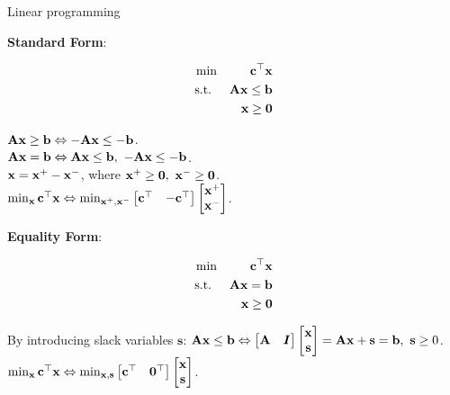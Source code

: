\documentclass[11pt,compress,t,notes=noshow, xcolor=table]{beamer}
\begin{document}
\begin{vbframe}{Linear programming}
\framebreak

\textbf{Standard Form}:
\vspace{-\baselineskip}

\begin{eqnarray*}
\min && \mathbf{c}^\top\mathbf{x} \\
\text{s.t. } && \mathbf{A}\mathbf{x} \le \mathbf{b}\\
&& \mathbf{x} \ge \mathbf{0} \\
\end{eqnarray*}

$\mathbf{A}\mathbf{x} \ge \mathbf{b} \Leftrightarrow -\mathbf{A}\mathbf{x} \le -\mathbf{b}$.\\
$\mathbf{A}\mathbf{x} = \mathbf{b} \Leftrightarrow \mathbf{A}\mathbf{x} \le \mathbf{b},\ -\mathbf{A}\mathbf{x} \le -\mathbf{b}$.\\
$\mathbf{x} = \mathbf{x}^+ - \mathbf{x}^-$, where $\mathbf{x}^+ \ge \mathbf{0},\ \mathbf{x}^- \ge \mathbf{0}$.\\
$\min_{\mathbf{x}} \mathbf{c}^\top\mathbf{x} \Leftrightarrow \min_{\mathbf{x}^+, \mathbf{x}^-} \begin{bmatrix} \mathbf{c}^\top & -\mathbf{c}^\top \end{bmatrix} \begin{bmatrix} \mathbf{x}^+ \\ \mathbf{x}^- \end{bmatrix}$.

\framebreak
\textbf{Equality Form}:
\vspace{-\baselineskip}

\begin{eqnarray*}
\min && \mathbf{c}^\top\mathbf{x} \\
\text{s.t. } && \mathbf{A}\mathbf{x} = \mathbf{b}\\
&& \mathbf{x} \ge \mathbf{0} \\
\end{eqnarray*}

By introducing slack variables $\mathbf{s}$:
$\Amat\xv \le \mathbf{b} \Leftrightarrow \begin{bmatrix} \Amat & \id \end{bmatrix} \begin{bmatrix} \xv \\ \mathbf{s} \end{bmatrix} = \Amat\xv + \mathbf{s} = \mathbf{b},\ \mathbf{s} \ge 0$.\\
$\min_{\mathbf{x}} \mathbf{c}^\top\mathbf{x} \Leftrightarrow \min_{\mathbf{x},\mathbf{s}} \begin{bmatrix} \mathbf{c}^\top & \mathbf{0}^\top \end{bmatrix} \begin{bmatrix} \mathbf{x} \\ \mathbf{s} \end{bmatrix}$.

\end{vbframe}
\end{document}
